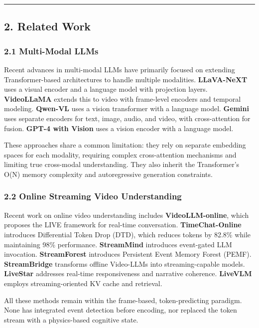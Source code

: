 \documentclass[
  11pt,
  a4paper,
]{article}
\begin{document}
\begin{center}\rule{0.5\linewidth}{0.5pt}\end{center}

\subsection{2. Related Work}\label{related-work}

\subsubsection{2.1 Multi-Modal LLMs}\label{multi-modal-llms}

Recent advances in multi-modal LLMs have primarily focused on extending
Transformer-based architectures to handle multiple modalities.
\textbf{LLaVA-NeXT} uses a visual encoder and a language model with
projection layers. \textbf{VideoLLaMA} extends this to video with
frame-level encoders and temporal modeling. \textbf{Qwen-VL} uses a
vision transformer with a language model. \textbf{Gemini} uses separate
encoders for text, image, audio, and video, with cross-attention for
fusion. \textbf{GPT-4 with Vision} uses a vision encoder with a language
model.

These approaches share a common limitation: they rely on separate
embedding spaces for each modality, requiring complex cross-attention
mechanisms and limiting true cross-modal understanding. They also
inherit the Transformer's O(N) memory complexity and autoregressive
generation constraints.

\subsubsection{2.2 Online Streaming Video
Understanding}\label{online-streaming-video-understanding}

Recent work on online video understanding includes
\textbf{VideoLLM-online}, which proposes the LIVE framework for
real-time conversation. \textbf{TimeChat-Online} introduces Differential
Token Drop (DTD), which reduces tokens by 82.8\% while maintaining 98\%
performance. \textbf{StreamMind} introduces event-gated LLM invocation.
\textbf{StreamForest} introduces Persistent Event Memory Forest (PEMF).
\textbf{StreamBridge} transforms offline Video-LLMs into
streaming-capable models. \textbf{LiveStar} addresses real-time
responsiveness and narrative coherence. \textbf{LiveVLM} employs
streaming-oriented KV cache and retrieval.

All these methods remain within the frame-based, token-predicting
paradigm. None has integrated event detection before encoding, nor
replaced the token stream with a physics-based cognitive state.
\end{document}
